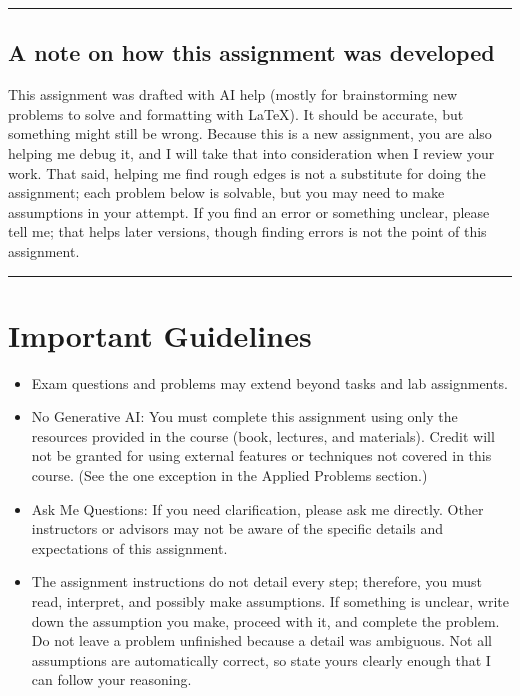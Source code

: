 \documentclass[11pt]{article}
\begin{document}
\AssignmentTitleBlock

\begin{center}
\rule{0.95\linewidth}{0.6pt}
\end{center}
\subsection*{A note on how this assignment was developed}
\noindent
This assignment was drafted with AI help (mostly for brainstorming new
problems to solve and formatting with LaTeX). It should be accurate, but
something might still be wrong.
Because this is a new assignment, you are also helping me debug it, and I
will take that into consideration when I review your work. That said,
helping me find rough edges is not a substitute for doing the assignment;
each problem below is solvable, but you may need to make assumptions in
your attempt. If you find an error or
something unclear, please tell me; that helps later versions, though
finding errors is not the point of this assignment.
\begin{center}
\rule{0.95\linewidth}{0.6pt}
\end{center}
\vspace{0.6em}

\section{Important Guidelines}
\begin{itemize}[leftmargin=1.4em]
  \item Exam questions and problems may extend beyond tasks and lab assignments.
  \item No Generative AI: You must complete this assignment using only the
        resources provided in the course (book, lectures, and materials).
        Credit will not be granted for using external features or techniques
        not covered in this course. (See the one exception in the Applied
        Problems section.)
  \item Ask Me Questions: If you need clarification, please ask me directly.
        Other instructors or advisors may not be aware of the specific
        details and expectations of this assignment.
  \item The assignment instructions do not detail every step; therefore, you
        must read, interpret, and possibly make assumptions. If something is
        unclear, write down the assumption you make, proceed with it, and
        complete the problem. Do not leave a problem unfinished because a
        detail was ambiguous. Not all assumptions are automatically correct,
        so state yours clearly enough that I can follow your reasoning.
\end{itemize}
\end{document}

